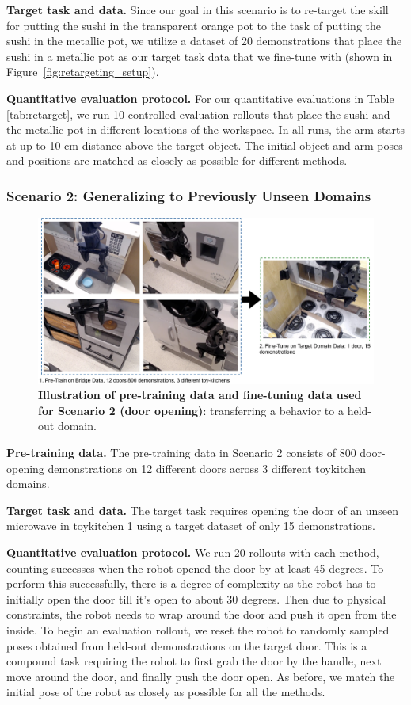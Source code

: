 \documentclass[conference]{IEEEtran}
\begin{document}
\textbf{Target task and data.} Since our goal in this scenario is to re-target the skill for putting the sushi in the transparent orange pot to the task of putting the sushi in the metallic pot, we utilize a dataset of 20 demonstrations that place the sushi in a metallic pot as our target task data that we fine-tune with (shown in Figure~\ref{fig:retargeting_setup}). 

\textbf{Quantitative evaluation protocol.} For our quantitative evaluations in Table \ref{tab:retarget}, we run 10 controlled evaluation rollouts that place the sushi and the metallic pot in different locations of the workspace. In all runs, the arm starts at up to 10 cm distance above the target object. The initial object and arm poses and positions are matched as closely as possible for different methods.

\subsubsection{Scenario 2: Generalizing to Previously Unseen Domains}

\begin{figure}
\centering
  \includegraphics[width=0.83\linewidth]{scenario2_overview.pdf}
  \caption{\footnotesize \textbf{Illustration of pre-training data and fine-tuning data used for Scenario 2 (door opening)}: transferring a behavior to a held-out domain.}
  \vspace{-0.5cm}
  \label{fig:door_open_setup}
\end{figure}


\textbf{Pre-training data.} The pre-training data in Scenario 2 consists of 800 door-opening demonstrations on 12 different doors across 3 different toykitchen domains.

\textbf{Target task and data.} The target task requires opening the door of an unseen microwave in toykitchen 1 using a target dataset of only 15 demonstrations.

\textbf{Quantitative evaluation protocol.} We run 20 rollouts with each method, counting successes when the robot opened the door by at least 45 degrees. To perform this successfully, there is a degree of complexity as the robot has to initially open the door till it's open to about 30 degrees. Then due to physical constraints, the robot needs to wrap around the door and push it open from the inside. To begin an evaluation rollout, we reset the robot to randomly sampled poses obtained from held-out demonstrations on the target door.  This is a compound task requiring the robot to first grab the door by the handle, next move around the door, and finally push the door open. As before, we match the initial pose of the robot as closely as possible for all the methods. 
\end{document}
